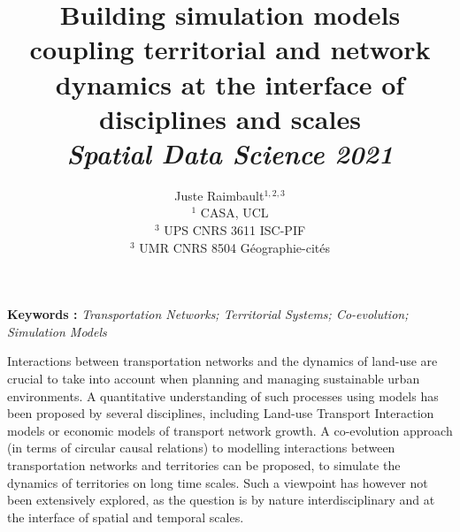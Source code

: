 \documentclass[11pt]{article}
\begin{document}
\title{Building simulation models coupling territorial and network dynamics at the interface of disciplines and scales\\
\textit{Spatial Data Science 2021}
}
\author{Juste Raimbault$^{1,2,3}$\\
$^1$ CASA, UCL\\
$^3$ UPS CNRS 3611 ISC-PIF\\
$^3$ UMR CNRS 8504 Géographie-cités
}
\date{}

\maketitle

\justify


\vspace{-0.5cm}
\textbf{Keywords : }\textit{Transportation Networks; Territorial Systems; Co-evolution; Simulation Models}

\medskip

Interactions between transportation networks and the dynamics of land-use are crucial to take into account when planning and managing sustainable urban environments. A quantitative understanding of such processes using models has been proposed by several disciplines, including Land-use Transport Interaction models or economic models of transport network growth. A co-evolution approach (in terms of circular causal relations) to modelling interactions between transportation networks and territories can be proposed, to simulate the dynamics of territories on long time scales. Such a viewpoint has however not been extensively explored, as the question is by nature interdisciplinary and at the interface of spatial and temporal scales.

\end{document}
